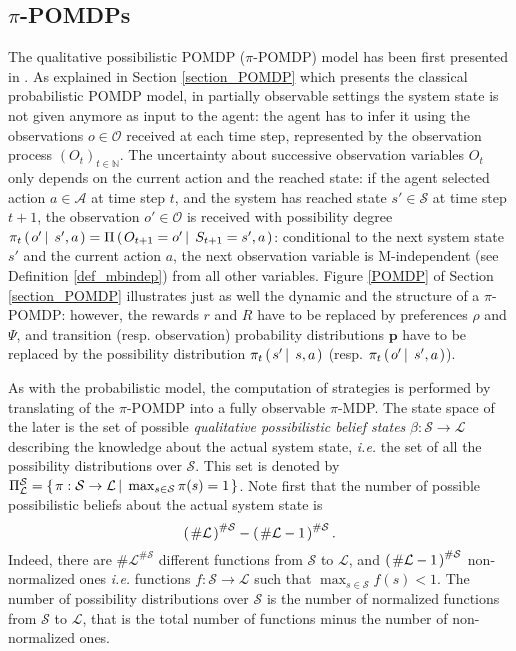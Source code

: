 \subsection{$\pi$-POMDPs}
\label{section_piPOMDP}
The qualitative possibilistic POMDP ($\pi$-POMDP) model has been first presented in \cite{Sabbadin:1999:pipomdp}.
As explained in Section \ref{section_POMDP} which presents the classical probabilistic POMDP model, 
in partially observable settings the system state is not given anymore as input to the agent:
the agent has to infer it using the observations $o \in \mathcal{O}$ 
received at each time step, represented by the observation process $(O_t)_{t \in \mathbb{N}}$.
The uncertainty about successive observation variables $O_t$
only depends on the current action and the reached state: 
if the agent selected action $a \in \mathcal{A}$ at time step $t$,
and the system has reached state $s' \in \mathcal{S}$ at time step $t+1$,
the observation $o' \in \mathcal{O}$ is received with possibility degree 
$\pi_t \left( \left.  o' \, \right| \left. \, s', a \right. \right) = \Pi \left( \left.  O_{t+1} = o' \, \right| \left. \, S_{t+1}=s', a  \right. \right)$:
conditional to the next system state $s'$ and the current action $a$,
the next observation variable is M-independent (see Definition \ref{def_mbindep}) 
from all other variables. Figure \ref{POMDP} of Section \ref{section_POMDP}
illustrates just as well the dynamic and the structure of a $\pi$-POMDP:
however, the rewards $r$ and $R$ have to be replaced by preferences $\rho$ and $\Psi$, 
and transition (resp. observation) probability distributions $\textbf{p}$ 
have to be replaced by the possibility distribution $\pi_t \left( \left. s' \, \right| \left. \, s,a \right. \right)$ 
(resp. $\pi_t \left( \left. o' \, \right| \left. \, s',a \right. \right)$).

As with the probabilistic model, the computation of strategies
is performed by translating of the $\pi$-POMDP
into a fully observable $\pi$-MDP.
The state space of the later is the set of 
possible \textit{qualitative possibilistic belief states} 
$\beta: \mathcal{S} \rightarrow \mathcal{L}$ describing the knowledge about the actual system state,
\textit{i.e.} the set of all the possibility distributions over $\mathcal{S}$.
This set is denoted by $\Pi^{\mathcal{S}}_{\mathcal{L}} = \left\{ \left.  \pi: \mathcal{S} \rightarrow \mathcal{L} \, \right| \left. \, \max_{s \in \mathcal{S}} \pi(s) = 1  \right. \right\}$. 
Note first that the number of possible possibilistic beliefs about the actual system state is
\begin{equation}
\label{equation_numberOfPossDistrib}
\left( \left. \# \mathcal{L} \right. \right)^{\# \mathcal{S}} - \left( \left. \# \mathcal{L} -1 \right. \right)^{\# \mathcal{S}}.
\end{equation}
Indeed, there are $\# \mathcal{L}^{\# \mathcal{S}}$ 
different functions from $\mathcal{S}$ to $\mathcal{L}$,
and $\left( \left.  \# \mathcal{L} - 1  \right. \right)^{\# \mathcal{S}}$ non-normalized ones
\textit{i.e.} functions $f: \mathcal{S} \rightarrow \mathcal{L}$ 
such that $\max_{s \in \mathcal{S}} f(s) <1$.
The number of possibility distributions over $\mathcal{S}$
is the number of normalized functions from $\mathcal{S}$ to $\mathcal{L}$,
that is the total number of functions minus the number of non-normalized ones.

